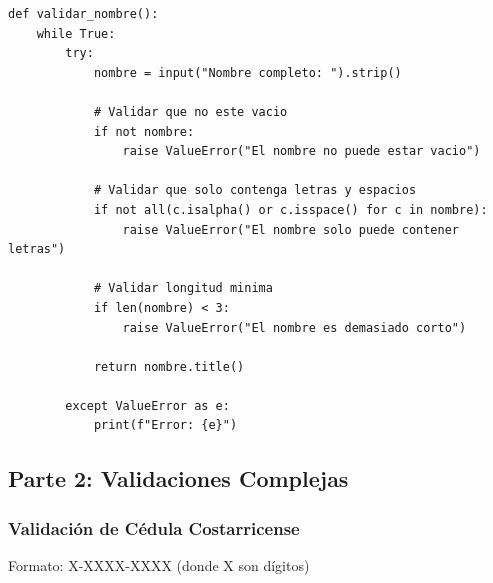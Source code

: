 \documentclass[12pt,a4paper]{article}
\begin{document}
\begin{lstlisting}[caption=Validación de nombre con excepciones]
def validar_nombre():
    while True:
        try:
            nombre = input("Nombre completo: ").strip()
            
            # Validar que no este vacio
            if not nombre:
                raise ValueError("El nombre no puede estar vacio")
            
            # Validar que solo contenga letras y espacios
            if not all(c.isalpha() or c.isspace() for c in nombre):
                raise ValueError("El nombre solo puede contener letras")
            
            # Validar longitud minima
            if len(nombre) < 3:
                raise ValueError("El nombre es demasiado corto")
            
            return nombre.title()
            
        except ValueError as e:
            print(f"Error: {e}")
\end{lstlisting}

\subsection{Parte 2: Validaciones Complejas}

\subsubsection{Validación de Cédula Costarricense}

Formato: X-XXXX-XXXX (donde X son dígitos)
\end{document}
